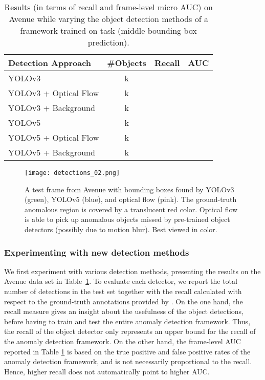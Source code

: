 \documentclass[times,twocolumn,final,authoryear]{elsarticle}
\begin{document}
\begin{table}[t]
\caption{Results (in terms of recall and frame-level micro AUC) on Avenue while varying the object detection methods of a framework trained on task  (middle bounding box prediction).}\label{tab_detections}
\setlength\tabcolsep{5pt}
\begin{center}
\begin{tabular}{|l|c|c|c|}
\hline
{Detection Approach} & \#Objects & Recall & AUC    \\
\hline \hline
YOLOv3               & k &  &  \\
YOLOv3 + Optical Flow& k &  &  \\
YOLOv3 + Background  & k &  &  \\
\hline
YOLOv5               & k &  &  \\
YOLOv5 + Optical Flow& k &  &  \\
YOLOv5 + Background  & k &  &  \\
\hline
\end{tabular}
\end{center}
\end{table}

\begin{figure}[t]
\begin{center}
   \texttt{[image: detections\_02.png]}
\end{center}
\vspace{-0.4cm}
   \caption{A test frame from Avenue with bounding boxes found by YOLOv3 (green), YOLOv5 (blue), and optical flow (pink). The ground-truth anomalous region is covered by a translucent red color. Optical flow is able to pick up anomalous objects missed by pre-trained object detectors (possibly due to motion blur). Best viewed in color.}
\label{fig:detections_02}
\end{figure}


\subsubsection{Experimenting with new detection methods}

We first experiment with various detection methods, presenting the results on the Avenue data set in Table~\ref{tab_detections}. To evaluate each detector, we report the total number of detections in the test set together with the recall calculated with respect to the ground-truth annotations provided by \cite{Ramachandra-WACV-2020a}.  On the one hand, the recall measure gives an insight about the usefulness of the object detections, before having to train and test the entire anomaly detection framework. Thus, the recall of the object detector only represents an upper bound for the recall of the anomaly detection framework. On the other hand, the frame-level AUC reported in Table \ref{tab_detections} is based on the true positive and false positive rates of the anomaly detection framework, and is not necessarily proportional to the recall. Hence, higher recall does not automatically point to higher AUC.
\end{document}
